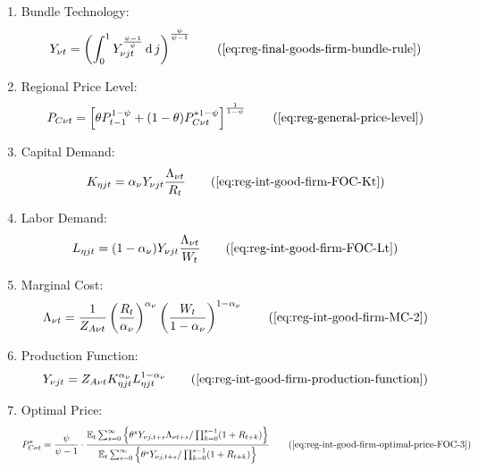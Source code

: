 \documentclass[
thesis.tex
]{subfiles}
\begin{document}
{\begin{itemize}
\begin{enumerate}
			\item Bundle Technology:
			\begin{align}
				Y_{\nu t} = \left( \int_{0}^{1} Y_{\nu jt}^{\frac{\psi-1}{\psi}} \dif j \right)^{\frac{\psi}{\psi-1}}
				\tag{\ref{eq:reg-final-goods-firm-bundle-rule}}
			\end{align}
			
			\item Regional Price Level:
			\begin{align}
				P_{C\nu t} = \left[ \theta P_{t-1}^{1-\psi} + (1-\theta) P_{C\nu t}^{\ast 1-\psi} \right]^\frac{1}{1-\psi}
				\tag{\ref{eq:reg-general-price-level}}
			\end{align}
			
			\item Capital Demand:
			\begin{align}
				K_{\eta jt} = {\alpha_\nu} Y_{\nu jt} \frac{\Lambda_{\nu t}}{R_t}
				\tag{\ref{eq:reg-int-good-firm-FOC-Kt}}
			\end{align}
			
			\item Labor Demand:
			\begin{align}
				L_{\eta jt} = (1-{\alpha_\nu}) Y_{\nu jt} \frac{\Lambda_{\nu t}}{W_t}
				\tag{\ref{eq:reg-int-good-firm-FOC-Lt}}
			\end{align}
			
			
			\item Marginal Cost:
			\begin{align}
				\Lambda_{\nu t} = \frac{1}{Z_{A\nu t}} \left( \frac{R_t}{{\alpha_\nu}} \right)^{{\alpha_\nu}} \left( \frac{W_t}{1-{\alpha_\nu}} \right)^{1-{\alpha_\nu}}
				\tag{\ref{eq:reg-int-good-firm-MC-2}}
			\end{align}
			
			\item Production Function:
			\begin{align}
				Y_{\nu jt} = Z_{A\nu t} K_{\eta jt}^{\alpha_\nu} L_{\eta jt}^{1-{\alpha_\nu}}
				\tag{\ref{eq:reg-int-good-firm-production-function}}
			\end{align}
			
			\item Optimal Price:
			\begin{align}
				P_{C\nu t}^\ast = \frac{\psi}{\psi-1} \cdot \frac{ \E \sum_{s=0}^{\infty} \left\{ \theta^s Y_{\nu j,t+s} \Lambda_{\nu t+s} / \prod_{k=0}^{s-1}(1+R_{t+k}) \right\} } {\E \sum_{s=0}^{\infty} \left\{ \theta^s Y_{\nu j,t+s} / \prod_{k=0}^{s-1}(1 + R_{t+k}) \right\}} \tag{\ref{eq:reg-int-good-firm-optimal-price-FOC-3}}
			\end{align}
			

\end{enumerate}
\end{itemize}}
\end{document}
